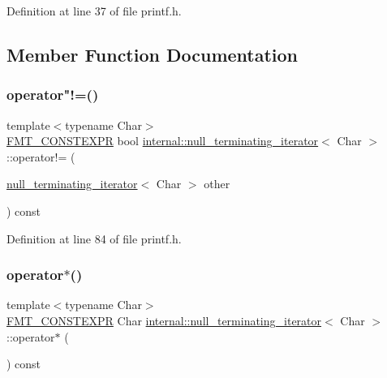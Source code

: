 Definition at line 37 of file printf.\+h.



\subsection{Member Function Documentation}
\mbox{\label{classinternal_1_1null__terminating__iterator_ad5636c82eff9966e9b536fc1a6683834}} 
\subsubsection{\texorpdfstring{operator"!=()}{operator!=()}}
{\footnotesize\ttfamily template$<$typename Char$>$ \\
\hyperlink{core_8h_a69201cb276383873487bf68b4ef8b4cd}{F\+M\+T\+\_\+\+C\+O\+N\+S\+T\+E\+X\+PR} bool \hyperlink{classinternal_1_1null__terminating__iterator}{internal\+::null\+\_\+terminating\+\_\+iterator}$<$ Char $>$\+::operator!= (\begin{DoxyParamCaption}\item[{\hyperlink{classinternal_1_1null__terminating__iterator}{null\+\_\+terminating\+\_\+iterator}$<$ Char $>$}]{other }\end{DoxyParamCaption}) const\hspace{0.3cm}{\ttfamily [inline]}}



Definition at line 84 of file printf.\+h.

\mbox{\label{classinternal_1_1null__terminating__iterator_ae26d5d8b609971417570b696bc8caa47}} 
\subsubsection{\texorpdfstring{operator$\ast$()}{operator*()}}
{\footnotesize\ttfamily template$<$typename Char$>$ \\
\hyperlink{core_8h_a69201cb276383873487bf68b4ef8b4cd}{F\+M\+T\+\_\+\+C\+O\+N\+S\+T\+E\+X\+PR} Char \hyperlink{classinternal_1_1null__terminating__iterator}{internal\+::null\+\_\+terminating\+\_\+iterator}$<$ Char $>$\+::operator$\ast$ (\begin{DoxyParamCaption}{ }\end{DoxyParamCaption}) const\hspace{0.3cm}{\ttfamily [inline]}}



